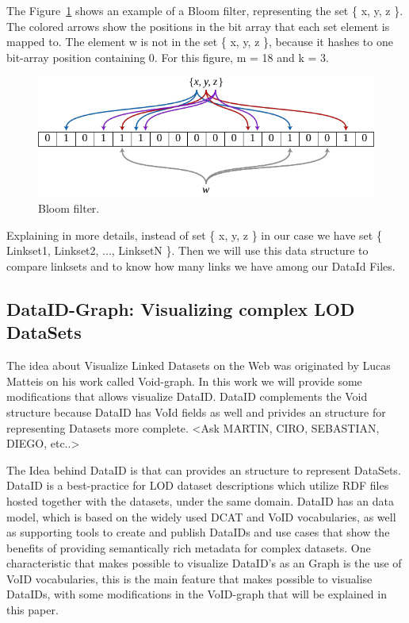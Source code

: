 \documentclass{iosart2c}
\begin{document}
The Figure~\ref{fig:bloomfilter} shows an example of a Bloom filter, representing the set \{ x, y, z \}. The colored arrows show the positions in the bit array that each set element is mapped to. The element w is not in the set \{ x, y, z \}, because it hashes to one bit-array position containing 0. For this figure, m = 18 and k = 3.
\begin{figure}
  \centering
  \includegraphics[width=\linewidth]{img/bloomfilter.png}
  \caption{Bloom filter.}
  \label{fig:bloomfilter}
\end{figure}

Explaining in more details, instead of set \{ x, y, z \} in our case we have set \{ Linkset1, Linkset2, ..., LinksetN \}. Then we will use this data structure to compare linksets and to know how many links we have among our DataId Files.

\subsection{DataID-Graph: Visualizing complex LOD DataSets}

The idea about Visualize Linked Datasets on the Web was originated by Lucas Matteis on his work called Void-graph. In this work we will provide some modifications that allows visualize DataID.
DataID complements the Void structure because DataID has VoId fields as well and privides an structure for representing Datasets more complete. <Ask MARTIN, CIRO, SEBASTIAN, DIEGO, etc..>

The Idea behind DataID \cite{dataID2014} is that can provides an structure to represent DataSets.
DataID is a best-practice for LOD dataset descriptions which utilize RDF files hosted together with the datasets, under the same domain. 
DataID has an data model, which is based on the widely used DCAT and VoID vocabularies, as well as supporting tools to create and publish DataIDs and use cases that show the benefits of providing semantically rich metadata for complex datasets.
One characteristic that makes possible to visualize DataID's as an Graph is the use of VoID vocabularies, this is the main feature that makes possible to visualise DataIDs, with some modifications in the VoID-graph \cite{Voidgraph} that will be explained in this paper.
\end{document}
